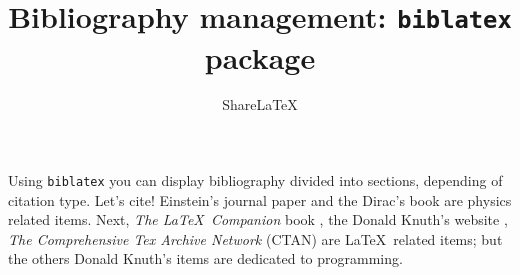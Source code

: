 \documentclass{article}
\title{Bibliography management: \texttt{biblatex} package}
\author{Share\LaTeX}
\date{ }
\begin{document}
 
\maketitle
 
Using \texttt{biblatex} you can display bibliography divided into sections, 
depending of citation type. 
Let's cite! Einstein's journal paper \cite{einstein} and the Dirac's 
book are physics related items. 
Next, \textit{The \LaTeX\ Companion} book , the Donald 
Knuth's website \cite{knuthwebsite}, \textit{The Comprehensive Tex Archive 
Network} (CTAN) \cite{ctan} are \LaTeX\ related items; but the others Donald 
Knuth's items \cite{knuth-fa,knuth-acp} are dedicated to programming. 
 
\medskip
 
\printbibliography
 
\end{document}
